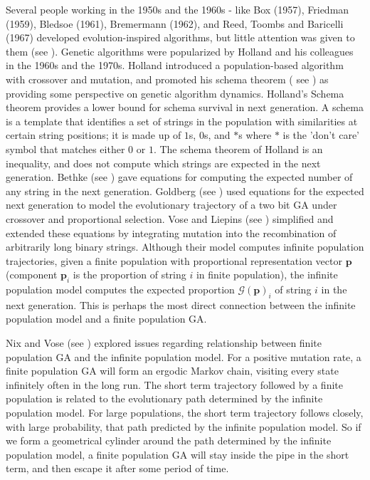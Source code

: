 Several people working in the 1950s and the 1960s - like Box (1957), Friedman (1959),
Bledsoe (1961), Bremermann (1962), and Reed, Toombs and Baricelli (1967) developed evolution-inspired algorithms, 
but little attention was given to them (see \cite{Mitchell1999}). Genetic algorithms were popularized by Holland 
and his colleagues in the 1960s and the 1970s. Holland introduced a population-based algorithm with crossover and mutation, 
and promoted his schema theorem ( see \cite{Holland1975}) as providing some perspective on genetic algorithm dynamics. 
Holland's Schema theorem provides a lower bound for schema survival in 
next generation. A schema is a template that identifies a set of strings in the population with similarities 
at certain string positions; it is made up of $1$s, $0$s, and $\ast$s where 
$\ast$ is the 'don't care' symbol that matches either $0$ or $1$. The schema theorem of Holland is an inequality, 
and does not compute which strings are expected in the next generation. 
Bethke (see \cite{Bethke1981}) gave equations for computing the expected number of any string in the next generation. 
Goldberg (see \cite{Goldberg1987}) used equations 
for the expected next generation to model the evolutionary trajectory of a two bit GA under crossover 
and proportional selection. Vose and Liepins (see \cite{VoseLiepins1991}) simplified and extended 
these equations by integrating mutation into the recombination of arbitrarily long binary strings. 
Although their model computes infinite population trajectories, given a finite population with proportional representation vector $\bm{p}$  
(component $\bm{p}_i$ is the proportion of string $i$ in finite population), the infinite population model 
computes the expected proportion $\mathcal{G}(\bm{p})_i$ of string $i$ in the next generation.  This is perhaps the most 
direct connection between the infinite population model and a finite population GA.

Nix and Vose (see \cite{Nix1992}) explored issues regarding relationship between finite population GA and the infinite population model. 
For a positive mutation rate, a finite population GA will form an ergodic Markov chain, visiting every state infinitely often in the long run.
The short term trajectory followed by a finite population is related to 
the evolutionary path determined by the infinite population model. 
For large populations, the short term trajectory follows closely, 
with large probability, that path predicted by 
the infinite population model. So if we form 
a geometrical cylinder 
around the path determined by the infinite population model, a finite population GA will stay inside the pipe in the short term, and 
then escape it after some period of time. 

